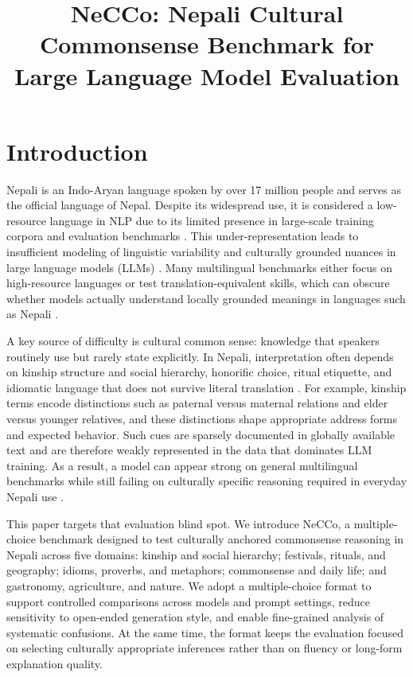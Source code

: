 \documentclass[10pt, a4paper]{article}
\title{NeCCo: Nepali Cultural Commonsense Benchmark for Large Language Model Evaluation}
\begin{document}
\maketitleabstract

\section{Introduction}
Nepali is an Indo-Aryan language spoken by over 17 million people and serves as the official language of Nepal. Despite its widespread use, it is considered a low-resource language in NLP due to its limited presence in large-scale training corpora and evaluation benchmarks \cite{shahi2022natural}. This under-representation leads to insufficient modeling of linguistic variability and culturally grounded nuances in large language models (LLMs) \cite{nyachhyon2025consolidating}. Many multilingual benchmarks either focus on high-resource languages or test translation-equivalent skills, which can obscure whether models actually understand locally grounded meanings in languages such as Nepali \cite{hu2020xtreme, liang2020xglue, nyachhyon2025consolidating}.

A key source of difficulty is cultural common sense: knowledge that speakers routinely use but rarely state explicitly. In Nepali, interpretation often depends on kinship structure and social hierarchy, honorific choice, ritual etiquette, and idiomatic language that does not survive literal translation \cite{krause1980kinship}. For example, kinship terms encode distinctions such as paternal versus maternal relations and elder versus younger relatives, and these distinctions shape appropriate address forms and expected behavior. Such cues are sparsely documented in globally available text and are therefore weakly represented in the data that dominates LLM training. As a result, a model can appear strong on general multilingual benchmarks while still failing on culturally specific reasoning required in everyday Nepali use \cite{thakur2025culturally}.

This paper targets that evaluation blind spot. We introduce NeCCo, a multiple-choice benchmark designed to test culturally anchored commonsense reasoning in Nepali across five domains: kinship and social hierarchy; festivals, rituals, and geography; idioms, proverbs, and metaphors; commonsense and daily life; and gastronomy, agriculture, and nature. We adopt a multiple-choice format to support controlled comparisons across models and prompt settings, reduce sensitivity to open-ended generation style, and enable fine-grained analysis of systematic confusions. At the same time, the format keeps the evaluation focused on selecting culturally appropriate inferences rather than on fluency or long-form explanation quality.
\end{document}
